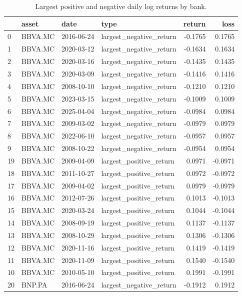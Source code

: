 \begin{table}
\caption{Largest positive and negative daily log returns by bank.}
\label{tab:extreme_returns_audit}
\begin{tabular}{llllrr}
\toprule
 & asset & date & type & return & loss \\
\midrule
0 & BBVA.MC & 2016-06-24 & largest_negative_return & -0.1765 & 0.1765 \\
1 & BBVA.MC & 2020-03-12 & largest_negative_return & -0.1634 & 0.1634 \\
2 & BBVA.MC & 2020-03-16 & largest_negative_return & -0.1435 & 0.1435 \\
3 & BBVA.MC & 2020-03-09 & largest_negative_return & -0.1416 & 0.1416 \\
4 & BBVA.MC & 2008-10-10 & largest_negative_return & -0.1210 & 0.1210 \\
5 & BBVA.MC & 2023-03-15 & largest_negative_return & -0.1009 & 0.1009 \\
6 & BBVA.MC & 2025-04-04 & largest_negative_return & -0.0984 & 0.0984 \\
7 & BBVA.MC & 2009-03-02 & largest_negative_return & -0.0979 & 0.0979 \\
8 & BBVA.MC & 2022-06-10 & largest_negative_return & -0.0957 & 0.0957 \\
9 & BBVA.MC & 2008-10-22 & largest_negative_return & -0.0954 & 0.0954 \\
19 & BBVA.MC & 2009-04-09 & largest_positive_return & 0.0971 & -0.0971 \\
18 & BBVA.MC & 2011-10-27 & largest_positive_return & 0.0972 & -0.0972 \\
17 & BBVA.MC & 2009-04-02 & largest_positive_return & 0.0979 & -0.0979 \\
16 & BBVA.MC & 2012-07-26 & largest_positive_return & 0.1013 & -0.1013 \\
15 & BBVA.MC & 2020-03-24 & largest_positive_return & 0.1044 & -0.1044 \\
14 & BBVA.MC & 2008-09-19 & largest_positive_return & 0.1137 & -0.1137 \\
13 & BBVA.MC & 2008-10-29 & largest_positive_return & 0.1306 & -0.1306 \\
12 & BBVA.MC & 2020-11-16 & largest_positive_return & 0.1419 & -0.1419 \\
11 & BBVA.MC & 2020-11-09 & largest_positive_return & 0.1540 & -0.1540 \\
10 & BBVA.MC & 2010-05-10 & largest_positive_return & 0.1991 & -0.1991 \\
20 & BNP.PA & 2016-06-24 & largest_negative_return & -0.1912 & 0.1912 \\

\end{tabular}
\end{table}
